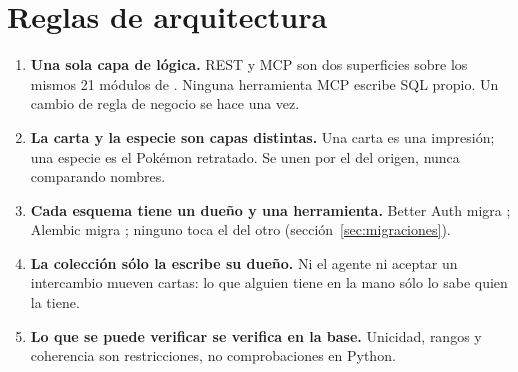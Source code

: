 \section{Reglas de arquitectura}

\begin{enumerate}[leftmargin=1.4em,itemsep=4pt,topsep=3pt]
  \item \textbf{Una sola capa de lógica.} REST y MCP son dos superficies sobre
        los mismos 21 módulos de . Ninguna herramienta MCP
        escribe SQL propio. Un cambio de regla de negocio se hace una vez.
  \item \textbf{La carta y la especie son capas distintas.} Una carta es una
        impresión; una especie es el Pokémon retratado. Se unen por el
         del origen, nunca comparando nombres.
  \item \textbf{Cada esquema tiene un dueño y una herramienta.} Better Auth
        migra ; Alembic migra ; ninguno toca el del
        otro (sección~\ref{sec:migraciones}).
  \item \textbf{La colección sólo la escribe su dueño.} Ni el agente ni aceptar
        un intercambio mueven cartas: lo que alguien tiene en la mano sólo lo
        sabe quien la tiene.
  \item \textbf{Lo que se puede verificar se verifica en la base.} Unicidad,
        rangos y coherencia son restricciones, no comprobaciones en Python.
\end{enumerate}
